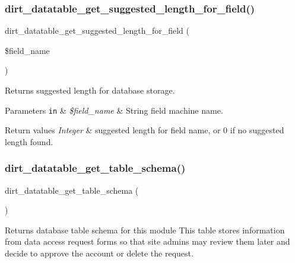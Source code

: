 \subsubsection{\texorpdfstring{dirt\+\_\+datatable\+\_\+get\+\_\+suggested\+\_\+length\+\_\+for\+\_\+field()}{dirt\_datatable\_get\_suggested\_length\_for\_field()}}
{\footnotesize\ttfamily dirt\+\_\+datatable\+\_\+get\+\_\+suggested\+\_\+length\+\_\+for\+\_\+field (\begin{DoxyParamCaption}\item[{}]{\$field\+\_\+name }\end{DoxyParamCaption})}

Returns suggested length for database storage.


\begin{DoxyParams}[1]{Parameters}
\mbox{\tt in}  & {\em \$field\+\_\+name} & String field machine name.\\
\hline
\end{DoxyParams}

\begin{DoxyRetVals}{Return values}
{\em Integer} & suggested length for field name, or 0 if no suggested length found. \\
\hline
\end{DoxyRetVals}
\mbox{\label{dirt__datatable_8table__schema_8inc_a449f729d1e50c581e40927f5ed37e5bb}} 
\subsubsection{\texorpdfstring{dirt\+\_\+datatable\+\_\+get\+\_\+table\+\_\+schema()}{dirt\_datatable\_get\_table\_schema()}}
{\footnotesize\ttfamily dirt\+\_\+datatable\+\_\+get\+\_\+table\+\_\+schema (\begin{DoxyParamCaption}{ }\end{DoxyParamCaption})}

Returns database table schema for this module This table stores information from data access request forms so that site admins may review them later and decide to approve the account or delete the request.

